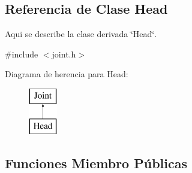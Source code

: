 \hypertarget{class_head}{\subsection{\-Referencia de \-Clase \-Head}
\label{class_head}
}


\-Aqui se describe la clase derivada \char`\"{}\-Head\char`\"{}.  




{\ttfamily \#include $<$joint.\-h$>$}

\-Diagrama de herencia para \-Head\-:\begin{figure}[H]
\begin{center}
\leavevmode
\includegraphics[height=2.000000cm]{class_head}
\end{center}
\end{figure}
\subsection*{\-Funciones \-Miembro \-Públicas}

